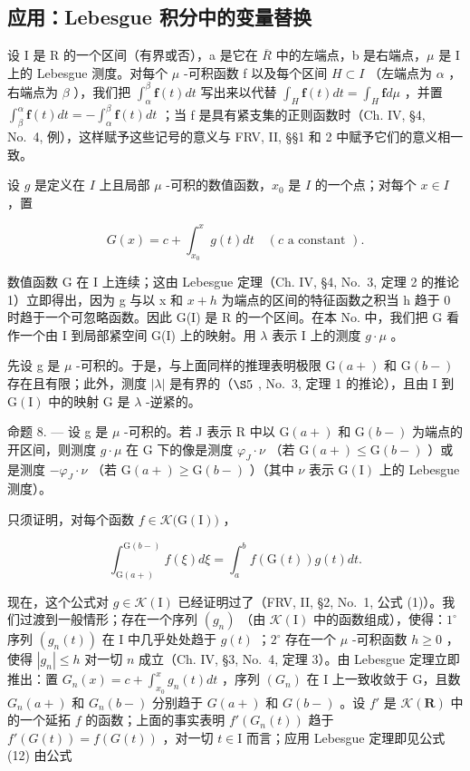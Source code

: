\subsection{应用：Lebesgue 积分中的变量替换}

设 I 是 R 的一个区间（有界或否），a 是它在 \(\overline{R}\) 中的左端点，b 是右端点，\(\mu\) 是 I 上的 Lebesgue 测度。对每个 \(\mu\) -可积函数 f 以及每个区间 \(H \subset I\) （左端点为 \(\alpha\) ，右端点为 \(\beta\) ），我们把 \(\int_{\alpha}^{\beta} \mathbf{f}(t) dt\) 写出来以代替 \(\int_{H} \mathbf{f}(t) dt = \int_{H} \mathbf{f} d\mu\) ，并置 \(\int_{\beta}^{\alpha} \mathbf{f}(t) dt = -\int_{\alpha}^{\beta} \mathbf{f}(t) dt\) ；当 f 是具有紧支集的正则函数时（Ch. IV, §4, No.~4, 例），这样赋予这些记号的意义与 FRV, II, §§1 和 2 中赋予它们的意义相一致。

设 \(g\) 是定义在 \(I\) 上且局部 \(\mu\) -可积的数值函数，\(x_0\) 是 \(I\) 的一个点；对每个 \(x \in I\) ，置

\[
G (x) = c + \int_ {x _ {0}} ^ {x} g (t) d t \quad (c \text {   a   constant }).\tag{11}
\]

数值函数 G 在 I 上连续；这由 Lebesgue 定理（Ch. IV, §4, No.~3, 定理 2 的推论 1）立即得出，因为 g 与以 x 和 \(x + h\) 为端点的区间的特征函数之积当 h 趋于 0 时趋于一个可忽略函数。因此 G(I) 是 R 的一个区间。在本 No. 中，我们把 G 看作一个由 I 到局部紧空间 G(I) 上的映射。用 \(\lambda\) 表示 I 上的测度 \(g \cdot \mu\) 。

先设 g 是 \(\mu\) -可积的。于是，与上面同样的推理表明极限 \(\mathrm{G}(a+)\) 和 \(\mathrm{G}(b-)\) 存在且有限；此外，测度 \(|\lambda|\) 是有界的（\(\S5\) , No.~3, 定理 1 的推论），且由 I 到 \(\mathrm{G}(\mathrm{I})\) 中的映射 G 是 \(\lambda\) -逆紧的。

命题 8. --- 设 g 是 \(\mu\) -可积的。若 J 表示 R 中以 \(\mathrm{G}(a+)\) 和 \(\mathrm{G}(b-)\) 为端点的开区间，则测度 \(g \cdot \mu\) 在 G 下的像是测度 \(\varphi_{J} \cdot \nu\) （若 \(\mathrm{G}(a+) \leqslant \mathrm{G}(b-)\) ）或是测度 \(-\varphi_{J} \cdot \nu\) （若 \(\mathrm{G}(a+) \geqslant \mathrm{G}(b-)\) ）（其中 \(\nu\) 表示 \(\mathrm{G}(\mathrm{I})\) 上的 Lebesgue 测度）。

只须证明，对每个函数 \(f \in \mathcal{K}\big(\mathrm{G}(\mathrm{I})\big)\) ，

\[
\int_ {\mathrm{G} (a +)} ^ {\mathrm{G} (b -)} f (\xi) d \xi = \int_ {a} ^ {b} f (\mathrm{G} (t)) g (t) d t.\tag{12}
\]

现在，这个公式对 \(g \in \mathcal{K}(\mathrm{I})\) 已经证明过了（FRV, II, §2, No.~1, 公式 (1)）。我们过渡到一般情形；存在一个序列 \((g_n)\) （由 \(\mathcal{K}(\mathrm{I})\) 中的函数组成），使得：\(1^\circ\) 序列 \((g_n(t))\) 在 I 中几乎处处趋于 \(g(t)\) ；\(2^\circ\) 存在一个 \(\mu\) -可积函数 \(h \geqslant 0\) ，使得 \(|g_n| \leqslant h\) 对一切 \(n\) 成立（Ch. IV, §3, No.~4, 定理 3）。由 Lebesgue 定理立即推出：置 \(G_n(x) = c + \int_{x_0}^x g_n(t) dt\) ，序列 \((G_n)\) 在 I 上一致收敛于 G，且数 \(G_n(a+)\) 和 \(G_n(b-)\) 分别趋于 \(G(a+)\) 和 \(G(b-)\) 。设 \(f'\) 是 \(\mathcal{K}(\mathbf{R})\) 中的一个延拓 \(f\) 的函数；上面的事实表明 \(f'(G_n(t))\) 趋于 \(f'(G(t)) = f(G(t))\) ，对一切 \(t \in \mathrm{I}\) 而言；应用 Lebesgue 定理即见公式 (12) 由公式

